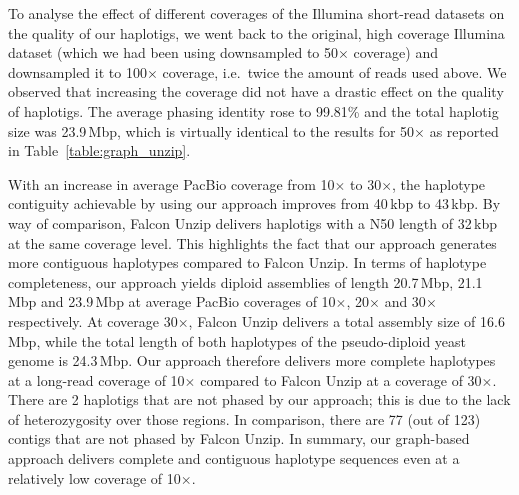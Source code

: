To analyse the effect of different coverages of the Illumina short-read datasets on the quality of our haplotigs, we went back to the original, high coverage Illumina dataset (which we had been using downsampled to 50$\times$ coverage) and downsampled it to 100$\times$ coverage, i.e.\ twice the amount of reads used above.
We observed that increasing the coverage did not have a drastic effect on the quality of haplotigs.
The average phasing identity rose to 99.81\% and the total haplotig size was 23.9\,Mbp, which is virtually identical to the results for 50$\times$ as reported in Table~\ref{table:graph_unzip}.

With an increase in average PacBio coverage from 10$\times$ to 30$\times$, the haplotype contiguity achievable by using our approach improves from 40\,kbp to 43\,kbp.
By way of comparison, Falcon Unzip delivers haplotigs with a N50 length of 32\,kbp at the same coverage level. This highlights the fact that our approach generates more contiguous haplotypes compared to Falcon Unzip.
In terms of haplotype completeness, our approach yields diploid assemblies of length 20.7\,Mbp, 21.1\,Mbp and 23.9\,Mbp at average PacBio coverages of 10$\times$, 20$\times$ and 30$\times$ respectively.
At coverage 30$\times$, Falcon Unzip delivers a total assembly size of 16.6\,Mbp, while the total length of both haplotypes of the pseudo-diploid yeast genome is 24.3\,Mbp.
Our approach therefore delivers more complete haplotypes at a long-read coverage of 10$\times$ compared to Falcon Unzip at a coverage of 30$\times$.
There are 2 haplotigs that are not phased by our approach; this is due to the lack of heterozygosity over those regions.
In comparison, there are 77 (out of 123) contigs that are not phased by Falcon Unzip.
In summary, our graph-based approach delivers complete and contiguous haplotype sequences even at a relatively low coverage of 10$\times$.
